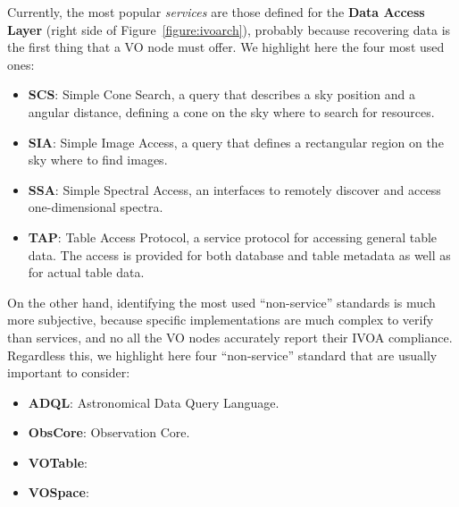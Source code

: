 Currently, the most popular \emph{services} are those defined for
the \textbf{Data Access Layer} (right side of Figure~\ref{figure:ivoarch}), 
probably because recovering data is the first thing that a VO node must offer.
We highlight here the four most used ones:
\begin{itemize}
\item \textbf{SCS}: Simple Cone Search, a query that describes a sky position and a
angular distance, defining a cone on the sky where to search for resources.
\item \textbf{SIA}: Simple Image Access, a query that defines a rectangular region on
the sky where to find images.
\item \textbf{SSA}: Simple Spectral Access, an interfaces to remotely discover
and access one-dimensional spectra. 
\item \textbf{TAP}: Table Access Protocol, a service protocol for accessing
general table data. The access is provided for both database and table metadata
as well as for actual table data.
\end{itemize}

On the other hand, identifying the most used ``non-service'' standards is much
more subjective, because specific implementations are much complex to verify
than services, and no all the VO nodes accurately report their IVOA compliance. 
Regardless this, we highlight here four ``non-service'' standard that are usually important
to consider:
\begin{itemize}
\item \textbf{ADQL}: Astronomical Data Query Language.
\item \textbf{ObsCore}: Observation Core.
\item \textbf{VOTable}: 
\item \textbf{VOSpace}: 
\end{itemize}






